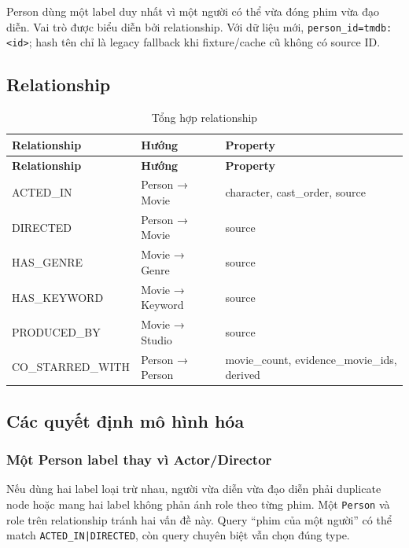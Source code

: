Person dùng một label duy nhất vì một người có thể vừa đóng phim vừa đạo diễn.
Vai trò được biểu diễn bởi relationship. Với dữ liệu mới, \texttt{person\_id=tmdb:<id>};
hash tên chỉ là legacy fallback khi fixture/cache cũ không có source ID.

\subsection{Relationship}

\begin{longtable}{|>{\raggedright\arraybackslash}p{}|>{\raggedright\arraybackslash}p{}|>{\raggedright\arraybackslash}p{}|}
\caption{Tổng hợp relationship}\label{tab:3-2} \\
\hline
\textbf{Relationship} & \textbf{Hướng} & \textbf{Property} \\ \hline
\endfirsthead\hline \textbf{Relationship} & \textbf{Hướng} & \textbf{Property} \\ \hline\endhead
ACTED\_IN & Person → Movie & character, cast\_order, source \\ \hline
DIRECTED & Person → Movie & source \\ \hline
HAS\_GENRE & Movie → Genre & source \\ \hline
HAS\_KEYWORD & Movie → Keyword & source \\ \hline
PRODUCED\_BY & Movie → Studio & source \\ \hline
CO\_STARRED\_WITH & Person → Person & movie\_count, evidence\_movie\_ids, derived \\ \hline
\end{longtable}

\subsection{Các quyết định mô hình hóa}

\subsubsection{Một Person label thay vì Actor/Director}

Nếu dùng hai label loại trừ nhau, người vừa diễn vừa đạo diễn phải duplicate node
hoặc mang hai label không phản ánh role theo từng phim. Một \texttt{Person} và role trên
relationship tránh hai vấn đề này. Query “phim của một người” có thể match
\texttt{ACTED\_IN|DIRECTED}, còn query chuyên biệt vẫn chọn đúng type.


